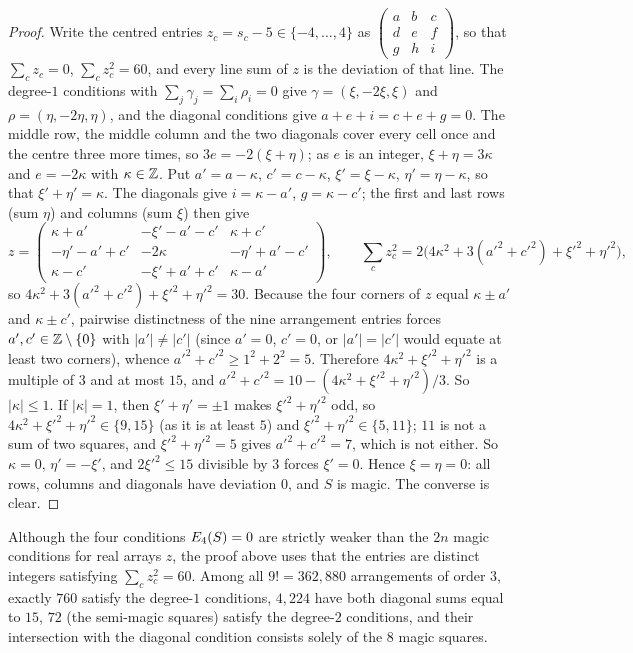 \begin{proof}
Write the centred entries $z_c=s_c-5\in\{-4,\dots,4\}$ as $\left(\begin{smallmatrix}a&b&c\\d&e&f\\g&h&i\end{smallmatrix}\right)$, so that $\sum_cz_c=0$, $\sum_cz_c^2=60$, and every line sum of $z$ is the deviation of that line.
The degree-$1$ conditions with $\sum_j\gamma_j=\sum_i\rho_i=0$ give $\gamma=(\xi,-2\xi,\xi)$ and $\rho=(\eta,-2\eta,\eta)$, and the diagonal conditions give $a+e+i=c+e+g=0$.
The middle row, the middle column and the two diagonals cover every cell once and the centre three more times, so $3e=-2(\xi+\eta)$; as $e$ is an integer, $\xi+\eta=3\kappa$ and $e=-2\kappa$ with $\kappa\in\mathbb{Z}$.
Put $a'=a-\kappa$, $c'=c-\kappa$, $\xi'=\xi-\kappa$, $\eta'=\eta-\kappa$, so that $\xi'+\eta'=\kappa$.
The diagonals give $i=\kappa-a'$, $g=\kappa-c'$; the first and last rows (sum $\eta$) and columns (sum $\xi$) then give
\[
z=\begin{pmatrix}\kappa+a'&-\xi'-a'-c'&\kappa+c'\\-\eta'-a'+c'&-2\kappa&-\eta'+a'-c'\\\kappa-c'&-\xi'+a'+c'&\kappa-a'\end{pmatrix},
\qquad
\sum_cz_c^2=2\bigl(4\kappa^2+3(a'^2+c'^2)+\xi'^2+\eta'^2\bigr),
\]
so $4\kappa^2+3(a'^2+c'^2)+\xi'^2+\eta'^2=30$.
Because the four corners of $z$ equal $\kappa\pm a'$ and $\kappa\pm c'$, pairwise distinctness of the nine arrangement entries forces $a',c'\in\mathbb{Z}\setminus\{0\}$ with $|a'|\ne|c'|$ (since $a'=0$, $c'=0$, or $|a'|=|c'|$ would equate at least two corners), whence $a'^2+c'^2\ge 1^2+2^2=5$. Therefore $4\kappa^2+\xi'^2+\eta'^2$ is a multiple of $3$ and at most $15$, and $a'^2+c'^2=10-(4\kappa^2+\xi'^2+\eta'^2)/3$.
So $|\kappa|\le1$.
If $|\kappa|=1$, then $\xi'+\eta'=\pm1$ makes $\xi'^2+\eta'^2$ odd, so $4\kappa^2+\xi'^2+\eta'^2\in\{9,15\}$ (as it is at least $5$) and $\xi'^2+\eta'^2\in\{5,11\}$; $11$ is not a sum of two squares, and $\xi'^2+\eta'^2=5$ gives $a'^2+c'^2=7$, which is not either.
So $\kappa=0$, $\eta'=-\xi'$, and $2\xi'^2\le15$ divisible by $3$ forces $\xi'=0$.
Hence $\xi=\eta=0$: all rows, columns and diagonals have deviation $0$, and $S$ is magic.
The converse is clear.
\end{proof}

\begin{remark}
\label{rem:n3_enum}
Although the four conditions $E_4(S)=0$ are strictly weaker than the $2n$ magic conditions for real arrays $z$, the proof above uses that the entries are distinct integers satisfying $\sum_cz_c^2=60$. Among all $9!=362{,}880$ arrangements of order $3$, exactly $760$ satisfy the degree-$1$ conditions, $4{,}224$ have both diagonal sums equal to $15$, $72$ (the semi-magic squares) satisfy the degree-$2$ conditions, and their intersection with the diagonal condition consists solely of the $8$ magic squares.
\end{remark}

